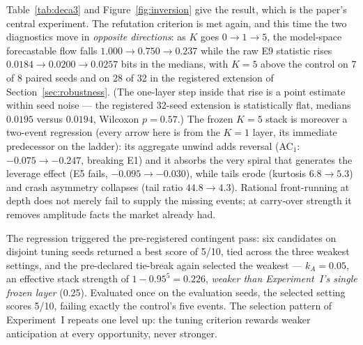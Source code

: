 \documentclass[11pt]{article}
\begin{document}
Table~\ref{tab:deca3} and Figure~\ref{fig:inversion} give the result, which
is the paper's central experiment. The refutation criterion is met again,
and this time the two
diagnostics move in \emph{opposite directions}: as $K$ goes $0 \to 1 \to 5$,
the model-space forecastable flow falls $1.000 \to 0.750 \to 0.237$ while the
raw E9 statistic rises $0.0184 \to 0.0200 \to 0.0257$ bits in the
medians, with $K{=}5$ above the control on 7 of 8 paired seeds and on 28
of 32 in the registered extension of Section~\ref{sec:robustness}. (The
one-layer step inside that rise is a point estimate within seed noise ---
the registered 32-seed extension is statistically flat, medians $0.0195$ versus
$0.0194$, Wilcoxon $p = 0.57$.) The frozen
$K{=}5$ stack is moreover a two-event regression (every arrow here is
from the $K{=}1$ layer, its immediate predecessor on the ladder): its
aggregate unwind adds
reversal (AC$_1$: $-0.075 \to -0.247$, breaking E1) and it absorbs the very
spiral that generates the leverage effect (E5 fails, $-0.095 \to -0.030$),
while tails erode (kurtosis $6.8 \to 5.3$) and crash asymmetry collapses (tail
ratio $44.8 \to 4.3$). Rational front-running at depth does not merely fail to
supply the missing events; at carry-over strength it removes amplitude facts the
market already had.

The regression triggered the pre-registered contingent pass: six candidates on
disjoint tuning seeds returned a best score of 5/10, tied across the three weakest
settings, and the pre-declared tie-break again selected the weakest ---
$k_A = 0.05$, an effective stack strength of $1 - 0.95^5 = 0.226$,
\emph{weaker than Experiment~I's single frozen layer} (0.25). Evaluated once
on the evaluation seeds, the selected setting scores 5/10, failing exactly
the control's five events. The selection pattern of Experiment~I repeats one
level up: the tuning criterion rewards weaker anticipation at every
opportunity, never stronger.
\end{document}
